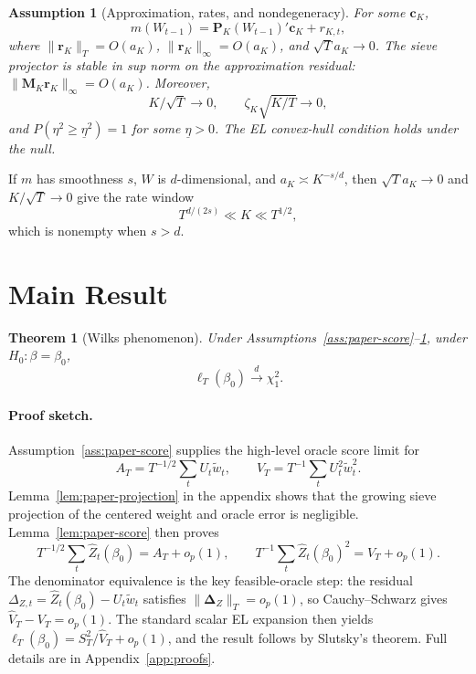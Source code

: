 \documentclass[11pt]{article}
\newtheorem{theorem}{Theorem}
\newtheorem{assumption}{Assumption}
\begin{document}
\begin{assumption}[Approximation, rates, and nondegeneracy]
\label{ass:paper-approx}
For some \(\bm c_K\),
\[
    m(W_{t-1})=\bm P_K(W_{t-1})'\bm c_K+r_{K,t},
\]
where \(\|\bm r_K\|_T=O(a_K)\), \(\|\bm r_K\|_\infty=O(a_K)\), and \(\sqrt T a_K\to0\). The sieve projector is stable in sup norm on the approximation residual: \(\|\bm M_K\bm r_K\|_\infty=O(a_K)\). Moreover,
\[
    K/\sqrt T\to0,
    \qquad
    \zeta_K\sqrt{K/T}\to0,
\]
and \(P(\eta^2\geq\underline\eta^2)=1\) for some \(\underline\eta>0\). The EL convex-hull condition holds under the null.
\end{assumption}

If \(m\) has smoothness \(s\), \(W\) is \(d\)-dimensional, and \(a_K\asymp K^{-s/d}\), then \(\sqrt T a_K\to0\) and \(K/\sqrt T\to0\) give the rate window
\begin{equation}
    T^{d/(2s)}\ll K\ll T^{1/2},
    \label{eq:paper-rate-window}
\end{equation}
which is nonempty when \(s>d\).

\section{Main Result}

\begin{theorem}[Wilks phenomenon]
\label{thm:paper-wilks}
Under Assumptions~\ref{ass:paper-score}--\ref{ass:paper-approx}, under \(H_0:\beta=\beta_0\),
\[
    \ell_T(\beta_0)\xrightarrow{d}\chi_1^2.
\]
\end{theorem}

\paragraph{Proof sketch.}
Assumption~\ref{ass:paper-score} supplies the high-level oracle score limit for
\[
    A_T=T^{-1/2}\sum_tU_t\widetilde w_t,
    \qquad
    V_T=T^{-1}\sum_tU_t^2\widetilde w_t^2.
\]
Lemma~\ref{lem:paper-projection} in the appendix shows that the growing sieve projection of the centered weight and oracle error is negligible. Lemma~\ref{lem:paper-score} then proves
\[
    T^{-1/2}\sum_t\widehat Z_t(\beta_0)=A_T+o_p(1),
    \qquad
    T^{-1}\sum_t\widehat Z_t(\beta_0)^2=V_T+o_p(1).
\]
The denominator equivalence is the key feasible-oracle step: the residual \(\Delta_{Z,t}=\widehat Z_t(\beta_0)-U_t\widetilde w_t\) satisfies \(\|\bm\Delta_Z\|_T=o_p(1)\), so Cauchy--Schwarz gives \(\widehat V_T-V_T=o_p(1)\). The standard scalar EL expansion then yields \(\ell_T(\beta_0)=S_T^2/\widehat V_T+o_p(1)\), and the result follows by Slutsky's theorem. Full details are in Appendix~\ref{app:proofs}.
\end{document}
